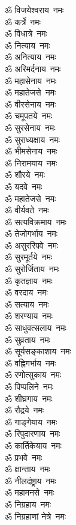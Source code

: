 \begin{multicols}{2}
\begin{flushleft}
ॐ विजयेश्वराय~नमः\\
ॐ कर्त्रे~नमः\\
ॐ विधात्रे~नमः\\
ॐ नित्याय~नमः\\
ॐ अनित्याय~नमः\\
ॐ अरिमर्दनाय~नमः\\
ॐ महासेनाय~नमः\\
ॐ महातेजसे~नमः\\
ॐ वीरसेनाय~नमः\\
ॐ चमूपतये~नमः\hfill{}\\
ॐ सुरसेनाय~नमः\\
ॐ सुराध्यक्षाय~नमः\\
ॐ भीमसेनाय~नमः\\
ॐ निरामयाय~नमः\\
ॐ शौरये~नमः\\
ॐ यदवे~नमः\\
ॐ महातेजसे~नमः\\
ॐ वीर्यवते~नमः\\
ॐ सत्यविक्रमाय~नमः\\
ॐ तेजोगर्भाय~नमः\hfill{}\\
ॐ असुररिपवे~नमः\\
ॐ सुरमूर्तये~नमः\\
ॐ सुरोर्जिताय~नमः\\
ॐ कृतज्ञाय~नमः\\
ॐ वरदाय~नमः\\
ॐ सत्याय~नमः\\
ॐ शरण्याय~नमः\\
ॐ साधुवत्सलाय~नमः\\
ॐ सुव्रताय~नमः\\
ॐ सूर्यसङ्काशाय~नमः\hfill{}\\
ॐ वह्निगर्भाय~नमः\\
ॐ रणोत्सुकाय~नमः\\
ॐ पिप्पलिने~नमः\\
ॐ शीघ्रगाय~नमः\\
ॐ रौद्रये~नमः\\
ॐ गाङ्गेयाय~नमः\\
ॐ रिपुदारणाय~नमः\\
ॐ कार्तिकेयाय~नमः\\
ॐ प्रभवे~नमः\\
ॐ क्षान्ताय~नमः\hfill{}\\
ॐ नीलदंष्ट्राय~नमः\\
ॐ महामनसे~नमः\\
ॐ निग्रहाय~नमः\\
ॐ निग्रहाणां नेत्रे~नमः\\

\end{flushleft}
\end{multicols}
